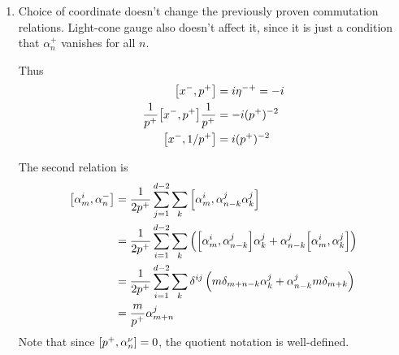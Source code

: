 \begin{enumerate}[label=(\alph*)]
	\item 

		Choice of coordinate doesn't change the previously proven commutation relations. Light-cone gauge also doesn't affect it, since it is just a condition that $\alpha^+_n$ vanishes for all $n$.

		Thus
		\begin{align}
			\comm{x^-}{p^+} &= i \eta^{-+} = - i \notag \\
			\frac{1}{p^+} \comm{x^-}{p^+}\frac{1}{p^+} &= -i (p^+)^{-2} \notag \\
			\comm{x^-}{1/p^+} &= i (p^+)^{-2}
		\end{align}

		The second relation is
		\begin{align}
			\comm{\alpha_m^i}{\alpha_n^-} &= \frac{1}{2p^+} \sum_{j=1}^{d-2} \sum_{k} \comm{\alpha_m^i}{\alpha_{n-k}^j \alpha_k^j} \notag \\
													&= \frac{1}{2p^+} \sum_{i=1}^{d-2} \sum_{k} \left( \comm{\alpha^{i}_m}{\alpha^j_{n-k}} \alpha^j_k + \alpha^j_{n-k} \comm{\alpha^i_m}{\alpha^j_{k}} \right) \notag \\
													&= \frac{1}{2p^+} \sum_{i=1}^{d-2} \sum_{k} \delta^{ij} \left(  m \delta_{m+n-k} \alpha^j_k + \alpha^j_{n-k} m \delta_{m+k} \right) \notag \\
													&= \frac{m}{p^+} \alpha^j_{m+n}
		\end{align}
		Note that since $\comm{p^+}{\alpha^\nu_n} = 0$, the quotient notation is well-defined.


\end{enumerate}
